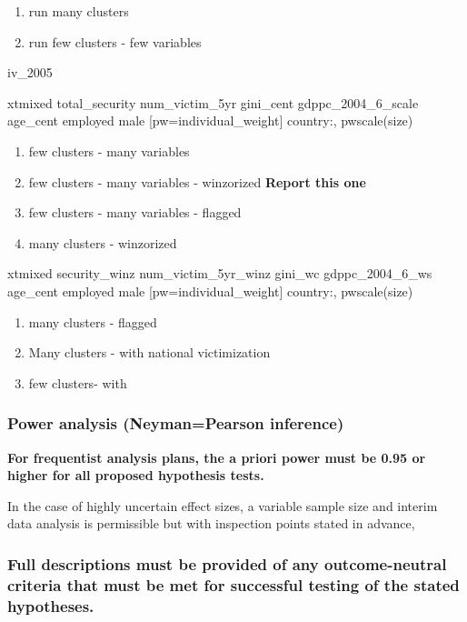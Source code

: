 \documentclass[
  english,
  man]{apa6}
\providecommand{\tightlist}{%
  \setlength{\itemsep}{0pt}\setlength{\parskip}{0pt}}
\begin{document}
\begin{enumerate}
\def\labelenumi{\arabic{enumi}.}
\tightlist
\item
  run many clusters
\item
  run few clusters - few variables
\end{enumerate}

iv\_2005

xtmixed total\_security num\_victim\_5yr gini\_cent gdppc\_2004\_6\_scale age\_cent employed male {[}pw=individual\_weight{]} \textbar\textbar{} country:, pwscale(size)

\begin{enumerate}
\def\labelenumi{\arabic{enumi}.}
\setcounter{enumi}{2}
\tightlist
\item
  few clusters - many variables
\item
  few clusters - many variables - winzorized \textbf{Report this one}
\item
  few clusters - many variables - flagged
\item
  many clusters - winzorized
\end{enumerate}

xtmixed security\_winz num\_victim\_5yr\_winz gini\_wc gdppc\_2004\_6\_ws age\_cent employed male {[}pw=individual\_weight{]} \textbar\textbar{} country:, pwscale(size)

\begin{enumerate}
\def\labelenumi{\arabic{enumi}.}
\setcounter{enumi}{6}
\tightlist
\item
  many clusters - flagged
\item
  Many clusters - with national victimization
\item
  few clusters- with
\end{enumerate}

\hypertarget{power-analysis-neymanpearson-inference}{%
\subsubsection{Power analysis (Neyman=Pearson inference)}\label{power-analysis-neymanpearson-inference}}

\textbf{For frequentist analysis plans, the a priori power must be 0.95 or higher for all proposed hypothesis tests.}

In the case of highly uncertain effect sizes, a variable sample size and interim data analysis is permissible but with inspection points stated in advance,

\hypertarget{full-descriptions-must-be-provided-of-any-outcome-neutral-criteria-that-must-be-met-for-successful-testing-of-the-stated-hypotheses.}{%
\subsubsection{Full descriptions must be provided of any outcome-neutral criteria that must be met for successful testing of the stated hypotheses.}\label{full-descriptions-must-be-provided-of-any-outcome-neutral-criteria-that-must-be-met-for-successful-testing-of-the-stated-hypotheses.}}
\end{document}
